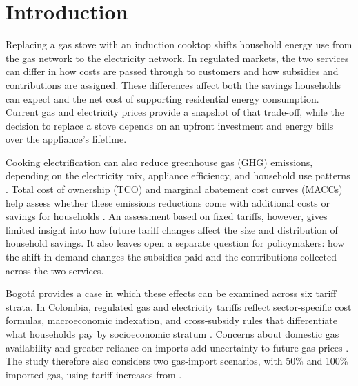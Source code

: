 \documentclass[authoryear,preprint,review,10pt]{elsarticle}
\begin{document}


\section{Introduction}
\label{introduction}

Replacing a gas stove with an induction cooktop shifts household energy use from the gas network to the electricity network. In regulated markets, the two services can differ in how costs are passed through to customers and how subsidies and contributions are assigned. These differences affect both the savings households can expect and the net cost of supporting residential energy consumption. Current gas and electricity prices provide a snapshot of that trade-off, while the decision to replace a stove depends on an upfront investment and energy bills over the appliance's lifetime.

Cooking electrification can also reduce greenhouse gas (GHG) emissions, depending on the electricity mix, appliance efficiency, and household use patterns \citep{yangka2016,im2020,lee2021,bandekar2022}. Total cost of ownership (TCO) and marginal abatement cost curves (MACCs) help assess whether these emissions reductions come with additional costs or savings for households \citep{cabrales2023costos,cimini2022,floess2023}. An assessment based on fixed tariffs, however, gives limited insight into how future tariff changes affect the size and distribution of household savings. It also leaves open a separate question for policymakers: how the shift in demand changes the subsidies paid and the contributions collected across the two services.

Bogotá provides a case in which these effects can be examined across six tariff strata. In Colombia, regulated gas and electricity tariffs reflect sector-specific cost formulas, macroeconomic indexation, and cross-subsidy rules that differentiate what households pay by socioeconomic stratum \citep{CREG119_2007,CREG137_2013,CREG183_2013,CREG184_2014,cabrales2023costos}. Concerns about domestic gas availability and greater reliance on imports add uncertainty to future gas prices \citep{ramirez2025macro_gas,cabrales2025politica_gas}. The study therefore also considers two gas-import scenarios, with 50\% and 100\% imported gas, using tariff increases from \citet{cabrales2025fedesarrollo_gas_imports}.
\end{document}
